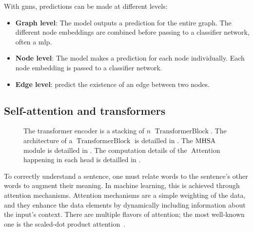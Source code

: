 \documentclass[../main.tex]{subfiles}
\begin{document}
		With \glspl{gnn}, predictions can be made at different levels:
		\begin{itemize}[nosep]
			\item \textbf{Graph level}: The model outputs a prediction for the entire graph.
				The different node embeddings are combined before passing to a classifier network, often a \gls{mlp}.
			\item \textbf{Node level}: The model makes a prediction for each node individually.
				Each node embedding is passed to a classifier network.
			\item \textbf{Edge level}: predict the existence of an edge between two nodes.
		\end{itemize}

	\subsection{Self-attention and transformers}\label{sec:self_attention_transformer}

		\begin{figure}[htbp]
			\centering
			\begin{subcaptiongroup}
				\ifSubfilesClassLoaded{%
				}{
				}
				\label{fig:transformer_block}
				\label{fig:transformer_mhsa}
				\label{fig:transformer_attention}
			\end{subcaptiongroup}
			\caption[Details of a Transformer block]{The transformer encoder is a stacking of \(n\) \(\operatorname{TransformerBlock}\). The architecture of a \(\operatorname{TransformerBlock}\) is detailled in . The \(\operatorname{MHSA}\) module is detailled in . The computation details of the \(\operatorname{Attention}\) happening in each head is detailled in .}\label{fig:transformers}
		\end{figure}

		To correctly understand a sentence, one must relate words to the sentence's other words to augment their meaning.
		In machine learning, this is achieved through attention mechanisms.
		Attention mechanisms are a simple weighting of the data, and they enhance the data elements by dynamically including information about the input's context.
		There are multiple flavors of attention; the most well-known one is the scaled-dot product attention~\cite{AttentionAllYouNeed}.
\end{document}
